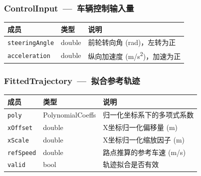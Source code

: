 \documentclass[a4paper,10pt]{article}
\begin{document}
\subsubsection{ControlInput~---~车辆控制输入量}
\begin{longtable}{|L{3.5cm}|C{2cm}|L{9.5cm}|}
\hline
\textbf{成员} & \textbf{类型} & \textbf{说明} \\
\hline
\texttt{steeringAngle} & double & 前轮转向角 (rad)，左转为正 \\
\hline
\texttt{acceleration} & double & 纵向加速度 (m/s\textsuperscript{2})，加速为正 \\
\hline
\end{longtable}

\subsubsection{FittedTrajectory~---~拟合参考轨迹}
\begin{longtable}{|L{3.5cm}|C{2cm}|L{9.5cm}|}
\hline
\textbf{成员} & \textbf{类型} & \textbf{说明} \\
\hline
\texttt{poly} & PolynomialCoeffs & 归一化坐标系下的多项式系数 \\
\hline
\texttt{xOffset} & double & X坐标归一化偏移量 (m) \\
\hline
\texttt{xScale} & double & X坐标归一化缩放因子 (m) \\
\hline
\texttt{refSpeed} & double & 路点推算的参考车速 (m/s) \\
\hline
\texttt{valid} & bool & 轨迹拟合是否有效 \\
\hline
\end{longtable}
\end{document}
